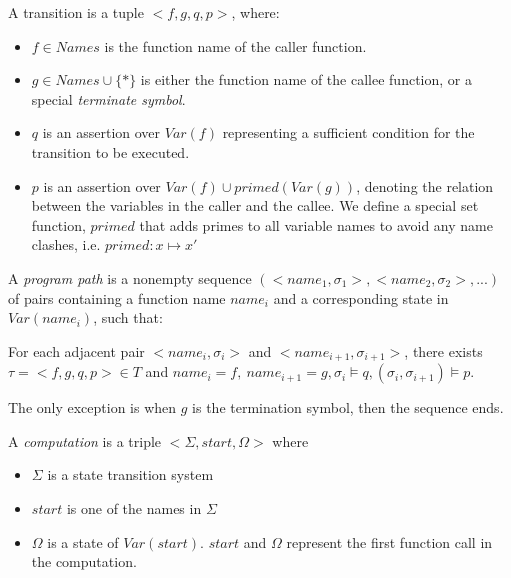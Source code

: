 \noindent
A transition is a tuple $<f,g,q,p>$, where:

\begin{itemize}
  \item $f \in Names$ is the function name of the caller function.
  \item $g \in Names \cup \{*\}$ is either the function name of the callee function, or a special {\it terminate symbol}.
  \item $q$ is an assertion over $Var(f)$ representing a sufficient condition for the transition to be executed.
  \item $p$ is an assertion over $Var(f) \cup primed(Var(g))$, denoting the relation between the variables in the caller and the callee. We define a special set function, $primed$ that adds primes to all variable names to avoid any name clashes, i.e. $primed: x \mapsto x'$
\end{itemize}

A {\it program path} is a nonempty sequence $(<name_1, \sigma_1>,<name_2, \sigma_2>,...)$ of pairs containing a function name $name_i$ and a corresponding state in $Var(name_i)$, such that:

\noindent
For each adjacent pair $<name_i,\sigma_i>$ and $<name_{i+1},\sigma_{i+1}>$, there exists $\tau=<f,g,q,p> \in T$ and $name_i = f,\ name_{i+1} = g, \sigma_i \models q, (\sigma_i,\sigma_{i+1}) \models p$.

\noindent
The only exception is when $g$ is the termination symbol, then the sequence ends.

A {\it computation} is a triple $<\Sigma, start, \Omega>$ where

\begin{itemize}
  \item $\Sigma$ is a state transition system
  \item $start$ is one of the names in $\Sigma$
  \item $\Omega$ is a state of $Var(start)$. $start$ and $\Omega$ represent the first function call in the computation.
\end{itemize}

